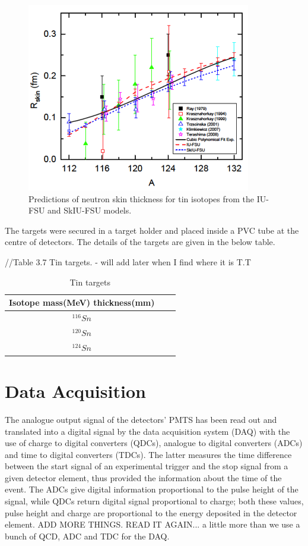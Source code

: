 \begin{figure}[H]
\begin{center}
\includegraphics[scale=0.8]{pictures/png/tiniso.png}
\caption{Predictions of neutron skin thickness for tin isotopes from the IU-FSU and SkIU-FSU models.}
\label{isochain}
\end{center}
\end{figure} 

\indent The targets were secured in a target holder and placed inside a PVC tube at the centre of detectors. The details of the targets are given in the below table.

//Table 3.7 Tin targets. - will add later when I find where it is T.T 
\begin{table}[ht]
\caption{Tin targets}
\centering
\begin{tabular}{c c  c}
\hline\hline
Isotope mass(MeV) thickness(mm)  \\
\hline
$^{116}Sn$ & & \\
\hline
$^{120}Sn$ & & \\
\hline
$^{124}Sn$ & & \\
\hline\hline
\end{tabular}
\label{table_cbparam}
\end{table} 
\section{Data Acquisition}

\indent The analogue output signal of the detectors' PMTS has been read out and translated into a digital signal by the data acquisition system (DAQ) with the use of charge to digital converters (QDCs), analogue to digital converters (ADCs) and time to digital converters (TDCs). The latter measures the time difference between the start signal of an experimental trigger and the stop signal from a given detector element, thus provided the information about the time of the event. The ADCs give digital information proportional to the pulse height of the signal, while QDCs return digital signal proportional to charge; both these values, pulse height and charge are proportional to the energy deposited in the detector element.
ADD MORE THINGS. READ IT AGAIN... a little more than we use a bunch of QCD, ADC and TDC for the DAQ.

